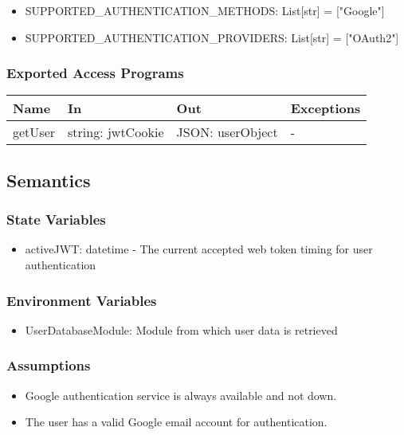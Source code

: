 \documentclass[12pt, titlepage]{article}
\begin{document}
\begin{itemize}
  \item SUPPORTED{\_}AUTHENTICATION{\_}METHODS: List[str] = ["Google"]
  \item SUPPORTED{\_}AUTHENTICATION{\_}PROVIDERS: List[str] = ["OAuth2"]
\end{itemize}

\subsubsection{Exported Access Programs}

\begin{center}
\begin{tabular}{p{2cm} p{4cm} p{5cm} p{3.5cm}}
\hline
\textbf{Name} & \textbf{In} & \textbf{Out} & \textbf{Exceptions} \\
\hline
getUser & string: jwtCookie & JSON: userObject & - \\
\hline
\end{tabular}
\end{center}

\subsection{Semantics}

\subsubsection{State Variables}
\begin{itemize}
  \item activeJWT: datetime - The current accepted web token timing for user authentication
\end{itemize}

\subsubsection{Environment Variables}

\begin{itemize}
  \item UserDatabaseModule: Module from which user data is retrieved
\end{itemize}

\subsubsection{Assumptions}

\begin{itemize}
  \item Google authentication service is always available and not down.
  \item The user has a valid Google email account for authentication.
\end{itemize}
\end{document}
